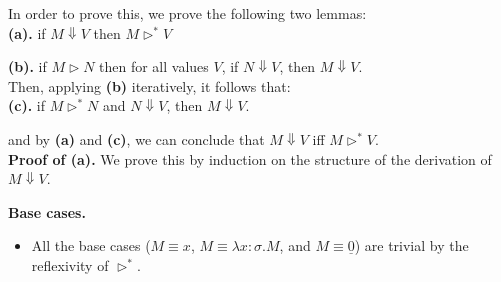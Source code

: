 In order to prove this, we prove the following two lemmas: \\

    \textbf{(a).} if $M \Downarrow V$ then $M \rhd^* V$

    \textbf{(b).} if $M \rhd N$ then for all values $V$, if $N \Downarrow V$, then $M \Downarrow V$. \\
    
    Then, applying \textbf{(b)} iteratively, it follows that: \\

    \textbf{(c).} if $M \rhd^* N$ and $N \Downarrow V$, then $M \Downarrow V$.

    and by \textbf{(a)} and \textbf{(c)}, we can conclude that $M \Downarrow V$ iff $M \rhd^* V$. \\
    \textbf{Proof of (a).} We prove this by induction on the structure of the derivation of $M \Downarrow V$. 

    \textbf{Base cases.}
    \begin{itemize}
        \item All the base cases ($M \equiv x$, $M \equiv \lambda x:\sigma.M$, and $M \equiv \underline{0}$) are trivial by the reflexivity of $\rhd^*$.
    \end{itemize}

